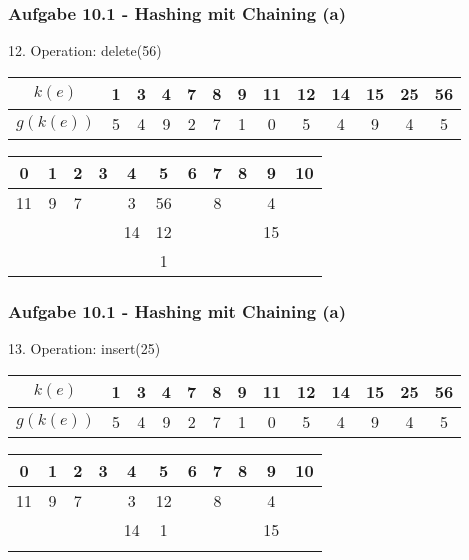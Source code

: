  \begin{frame}
    \frametitle{Aufgabe 10.1 - Hashing mit Chaining (a)}
    12. Operation: delete(56)
    \begin{center}
      \begin{tabular}{c|c|c|c|c|c|c|c|c|c|c|c|c}
        $k(e)$    & 1 & 3 & 4 & 7 & 8 & 9 & 11 & 12 & 14 & 15 & 25 & 56 \\
        \hline
        $g(k(e))$ & 5 & 4 & 9 & 2 & 7 & 1 & 0  & 5  & 4  & 9  & 4  & 5  \\
      \end{tabular}
  
      \bigskip
  
      \begin{tabular}{c|c|c|c|c|c|c|c|c|c|c}
        0  & 1 & 2 & 3 & 4  & 5  & 6 & 7 & 8 & 9  & 10 \\
        \hline
        11 & 9 & 7 &   & 3  & 56 &   & 8 &   & 4  &    \\
           &   &   &   & 14 & 12 &   &   &   & 15 &    \\
           &   &   &   &    & 1  &   &   &   &    &    \\
      \end{tabular}
    \end{center}
  \end{frame}
  
  \begin{frame}
    \frametitle{Aufgabe 10.1 - Hashing mit Chaining (a)}
    13. Operation: insert(25)
    \begin{center}
      \begin{tabular}{c|c|c|c|c|c|c|c|c|c|c|c|c}
        $k(e)$    & 1 & 3 & 4 & 7 & 8 & 9 & 11 & 12 & 14 & 15 & 25 & 56 \\
        \hline
        $g(k(e))$ & 5 & 4 & 9 & 2 & 7 & 1 & 0  & 5  & 4  & 9  & 4  & 5  \\
      \end{tabular}
  
      \bigskip
  
      \begin{tabular}{c|c|c|c|c|c|c|c|c|c|c}
        0  & 1 & 2 & 3 & 4  & 5  & 6 & 7 & 8 & 9  & 10 \\
        \hline
        11 & 9 & 7 &   & 3  & 12 &   & 8 &   & 4  &    \\
           &   &   &   & 14 & 1  &   &   &   & 15 &    \\
           &   &   &   &    &    &   &   &   &    &    \\
      \end{tabular}
    \end{center}
  \end{frame}
  
